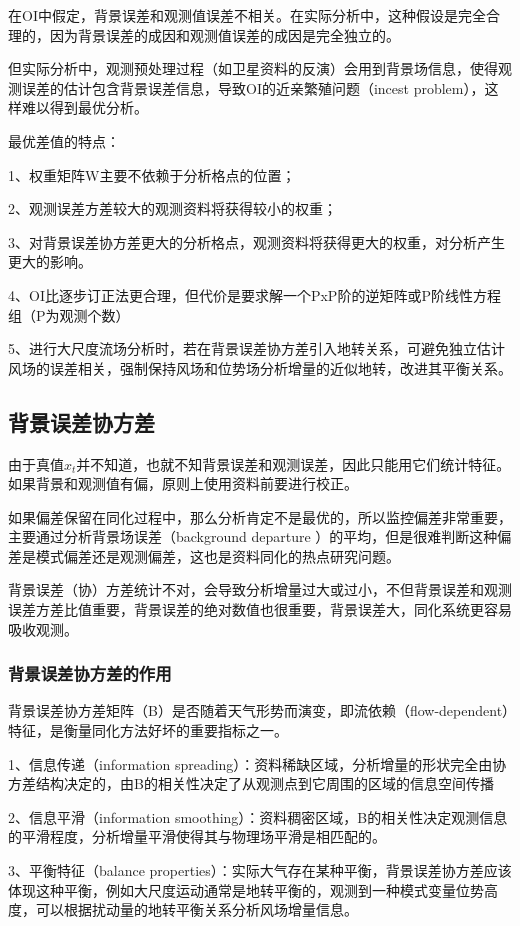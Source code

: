\documentclass{article}
\begin{document}
在OI中假定，背景误差和观测值误差不相关。在实际分析中，这种假设是完全合理的，因为背景误差的成因和观测值误差的成因是完全独立的。

但实际分析中，观测预处理过程（如卫星资料的反演）会用到背景场信息，使得观测误差的估计包含背景误差信息，导致OI的近亲繁殖问题（incest problem），这样难以得到最优分析。

最优差值的特点：

1、权重矩阵W主要不依赖于分析格点的位置；

2、观测误差方差较大的观测资料将获得较小的权重；

3、对背景误差协方差更大的分析格点，观测资料将获得更大的权重，对分析产生更大的影响。  

4、OI比逐步订正法更合理，但代价是要求解一个PxP阶的逆矩阵或P阶线性方程组（P为观测个数）

5、进行大尺度流场分析时，若在背景误差协方差引入地转关系，可避免独立估计风场的误差相关，强制保持风场和位势场分析增量的近似地转，改进其平衡关系。


\subsection{背景误差协方差}
由于真值$x_t$并不知道，也就不知背景误差和观测误差，因此只能用它们统计特征。如果背景和观测值有偏，原则上使用资料前要进行校正。

如果偏差保留在同化过程中，那么分析肯定不是最优的，所以监控偏差非常重要，主要通过分析背景场误差（background departure ）的平均，但是很难判断这种偏差是模式偏差还是观测偏差，这也是资料同化的热点研究问题。

背景误差（协）方差统计不对，会导致分析增量过大或过小，不但背景误差和观测误差方差比值重要，背景误差的绝对数值也很重要，背景误差大，同化系统更容易吸收观测。

\subsubsection{背景误差协方差的作用}
背景误差协方差矩阵（B）是否随着天气形势而演变，即流依赖（flow-dependent）特征，是衡量同化方法好坏的重要指标之一。

1、信息传递（information spreading）：资料稀缺区域，分析增量的形状完全由协方差结构决定的，由B的相关性决定了从观测点到它周围的区域的信息空间传播

2、信息平滑（information smoothing）：资料稠密区域，B的相关性决定观测信息的平滑程度，分析增量平滑使得其与物理场平滑是相匹配的。

3、平衡特征（balance properties）：实际大气存在某种平衡，背景误差协方差应该体现这种平衡，例如大尺度运动通常是地转平衡的，观测到一种模式变量位势高度，可以根据扰动量的地转平衡关系分析风场增量信息。
\end{document}
